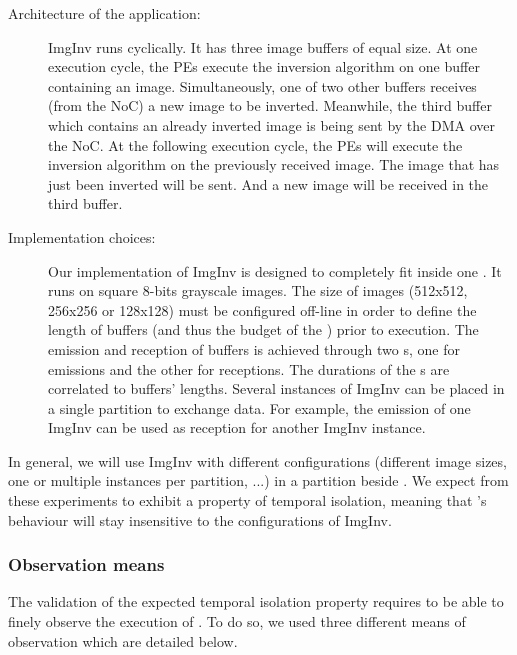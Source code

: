 \documentclass[main.tex]{subfiles}
\begin{document}
\begin{description}
    \item[Architecture of the application: ] ImgInv runs cyclically. It has three image buffers of equal size. At one execution cycle, the PEs execute the inversion algorithm on one buffer containing an image. Simultaneously, one of two other buffers receives (from the NoC) a new image to be inverted. Meanwhile, the third buffer which contains an already inverted image is being sent by the DMA over the NoC. At the following execution cycle, the PEs will execute the inversion algorithm on the previously received image. The image that has just been inverted will be sent. And a new image will be received in the third buffer.
    \item[Implementation choices: ] Our implementation of ImgInv is designed to completely fit inside one \PN{}. It runs on square 8-bits grayscale images. The size of images (512x512, 256x256 or 128x128) must be configured off-line in order to define the length of buffers (and thus the budget of the \PN{}) prior to execution. The emission and reception of buffers is achieved through two \PC{}s, one for emissions and the other for receptions. The durations of the \PC{}s are correlated to buffers' lengths. Several instances of ImgInv can be placed in a single partition to exchange data. For example, the emission \PC{} of one ImgInv \PN{} can be used as reception \PC{} for another ImgInv instance.
\end{description}

In general, we will use ImgInv with different configurations (different image sizes, one or multiple instances per partition, ...) in a partition beside \rosace. We expect from these experiments to exhibit a property of temporal isolation, meaning that \rosace's behaviour will stay insensitive to the configurations of ImgInv.

\subsubsection{Observation means}
The validation of the expected temporal isolation property requires to be able to finely observe the execution of \rosace. To do so, we used three different means of observation which are detailed below.
\end{document}
